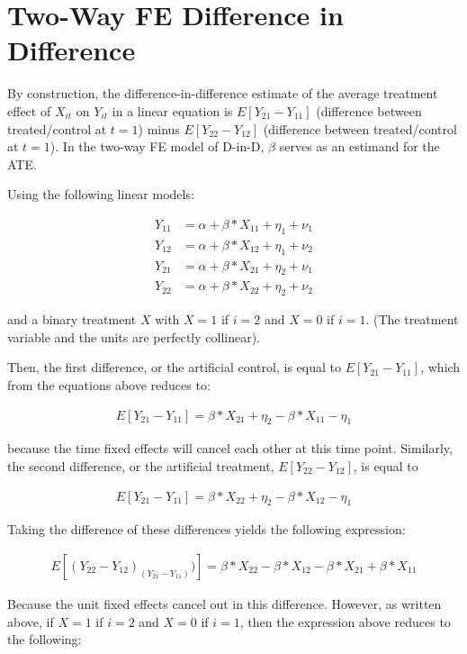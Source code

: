 \documentclass{article}
\begin{document}
	
\section*{Two-Way FE Difference in Difference}

By construction, the difference-in-difference estimate of the average treatment effect of $X_{it}$ on $Y_{it}$ in a linear equation is $E[Y_{21} - Y_{11}]$ (difference between treated/control at $t=1$) minus $E[Y_{22} - Y_{12}]$ (difference between treated/control at $t=1$). In the two-way FE model of D-in-D, $\beta$ serves as an estimand for the ATE.

Using the following linear models:

\begin{align*}
	Y_{11} &= \alpha + \beta * X_{11} + \eta_1 + \nu_1 \\
	Y_{12} &= \alpha + \beta * X_{12} + \eta_1 + \nu_2 \\
	Y_{21} &= \alpha + \beta * X_{21} + \eta_2 + \nu_1 \\
	Y_{22} &= \alpha + \beta * X_{22} + \eta_2 + \nu_2 
 \end{align*}
 
 and a binary treatment $X$ with $X=1$ if $i=2$ and $X=0$ if $i=1$. (The treatment variable and the units are perfectly collinear). 
 
 Then, the first difference, or the artificial control, is equal to $E[Y_{21} - Y_{11}]$, which from the equations above reduces to:
 
 \begin{align*}
 	E[Y_{21} - Y_{11}] = \beta * X_{21} + \eta_2 - \beta * X_{11} - \eta_1 
 \end{align*}

because the time fixed effects will cancel each other at this time point. Similarly, the second difference, or the artificial treatment, $E[Y_{22} - Y_{12}]$, is equal to 

\begin{align*}
E[Y_{21} - Y_{11}] = \beta * X_{22} + \eta_2 - \beta * X_{12} - \eta_1 
\end{align*}

Taking the difference of these differences yields the following expression:

\begin{align*}
	E[(Y_{22} - Y_{12}) _(Y_{21} - Y_{11}) )] = \beta*X_{22} - \beta*X_{12} - \beta * X_{21} + \beta * X_{11}
\end{align*}

Because the unit fixed effects cancel out in this difference. However, as written above, if $X=1$ if $i=2$ and $X=0$ if $i=1$, then the expression above reduces to the following:
\end{document}
